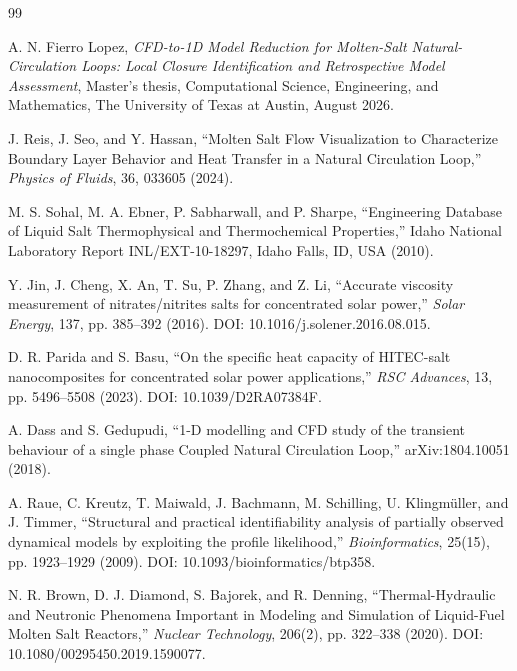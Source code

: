 \begin{thebibliography}{99}

A. N. Fierro Lopez, \emph{CFD-to-1D Model Reduction for Molten-Salt Natural-Circulation Loops: Local Closure Identification and Retrospective Model Assessment},
Master's thesis, Computational Science, Engineering, and Mathematics,
The University of Texas at Austin, August 2026.

J. Reis, J. Seo, and Y. Hassan, ``Molten Salt Flow Visualization to Characterize Boundary Layer Behavior and Heat Transfer in a Natural Circulation Loop,'' \emph{Physics of Fluids}, 36, 033605 (2024).

M. S. Sohal, M. A. Ebner, P. Sabharwall, and P. Sharpe, ``Engineering Database of Liquid Salt Thermophysical and Thermochemical Properties,'' Idaho National Laboratory Report INL/EXT-10-18297, Idaho Falls, ID, USA (2010).

Y. Jin, J. Cheng, X. An, T. Su, P. Zhang, and Z. Li, ``Accurate viscosity measurement of nitrates/nitrites salts for concentrated solar power,'' \emph{Solar Energy}, 137, pp. 385--392 (2016). DOI: 10.1016/j.solener.2016.08.015.

D. R. Parida and S. Basu, ``On the specific heat capacity of HITEC-salt nanocomposites for concentrated solar power applications,'' \emph{RSC Advances}, 13, pp. 5496--5508 (2023). DOI: 10.1039/D2RA07384F.

A. Dass and S. Gedupudi, ``1-D modelling and CFD study of the transient behaviour of a single phase Coupled Natural Circulation Loop,'' arXiv:1804.10051 (2018).

A. Raue, C. Kreutz, T. Maiwald, J. Bachmann, M. Schilling, U. Klingm\"uller, and J. Timmer, ``Structural and practical identifiability analysis of partially observed dynamical models by exploiting the profile likelihood,'' \emph{Bioinformatics}, 25(15), pp. 1923--1929 (2009). DOI: 10.1093/bioinformatics/btp358.


N. R. Brown, D. J. Diamond, S. Bajorek, and R. Denning, ``Thermal-Hydraulic and Neutronic Phenomena Important in Modeling and Simulation of Liquid-Fuel Molten Salt Reactors,'' \emph{Nuclear Technology}, 206(2), pp. 322--338 (2020). DOI: 10.1080/00295450.2019.1590077.


\end{thebibliography}
